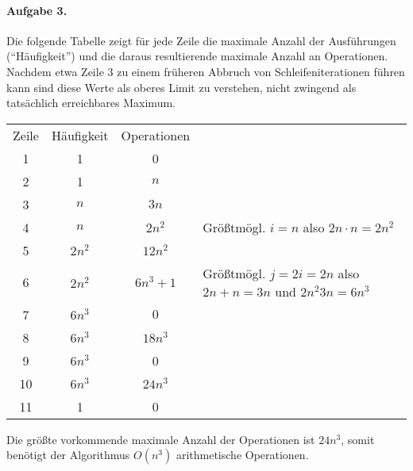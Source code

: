\documentclass{article}
\begin{document}
\paragraph{Aufgabe 3.}



Die folgende Tabelle zeigt für jede Zeile die maximale Anzahl der Ausführungen (\enquote{Häufigkeit}) und die daraus resultierende maximale Anzahl an Operationen. Nachdem etwa Zeile 3 zu einem früheren Abbruch von Schleifeniterationen führen kann sind diese Werte als oberes Limit zu verstehen, nicht zwingend als tatsächlich erreichbares Maximum.

\begin{tabular}{c c c l}
    Zeile & Häufigkeit & Operationen &  \\

    1   & 1         & 0             & \\
    2   & 1         & $n$           & \\
    3   & $n$       & $3n$          & \\
    4   & $n$       & $2n^2$        & Größtmögl. $i = n$ also $2n \cdot n = 2n^2$ \\
    5   & $2n^2$    & $12n^2$       & \\
    6   & $2n^2$    & $6n^3 + 1$    & Größtmögl. $j = 2i = 2n$ also $2n + n = 3n$ und $2n^{2} 3n = 6n^3$ \\
    7   & $6n^3$    & $0$           & \\
    8   & $6n^3$    & $18n^3$       & \\
    9   & $6n^3$    & 0             & \\
    10  & $6n^3$    & $24n^3$       & \\
    11  & 1         & 0             & \\
\end{tabular}

Die größte vorkommende maximale Anzahl der Operationen ist $24n^3$, somit benötigt der Algorithmus $O(n^3)$ arithmetische Operationen. 
\end{document}
